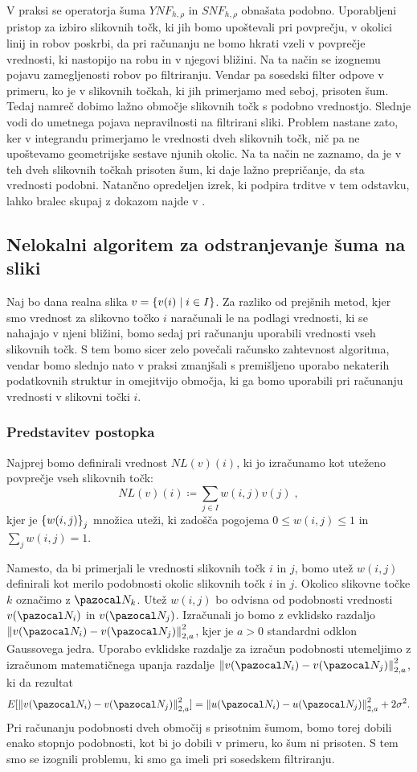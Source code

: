 V praksi se operatorja šuma $YNF_{h, \rho}$ in $SNF_{h, \rho}$ obnašata podobno. Uporabljeni pristop za izbiro slikovnih točk, ki jih bomo upoštevali pri povprečju, v okolici linij in robov poskrbi, da pri računanju ne bomo hkrati vzeli v povprečje vrednosti, ki nastopijo na robu in v njegovi bližini. Na ta način se izognemu pojavu zamegljenosti robov po filtriranju. Vendar pa sosedski filter odpove v primeru, ko je v slikovnih točkah, ki jih primerjamo med seboj, prisoten šum. Tedaj namreč dobimo lažno območje slikovnih točk s podobno vrednostjo. Slednje vodi do umetnega pojava nepravilnosti na filtrirani sliki. Problem nastane zato, ker v integrandu primerjamo le vrednosti dveh slikovnih točk, nič pa ne upoštevamo geometrijske sestave njunih okolic. Na ta način ne zaznamo, da je v teh dveh slikovnih točkah prisoten šum, ki daje lažno prepričanje, da sta vrednosti podobni. Natančno opredeljen izrek, ki podpira trditve v tem odstavku, lahko bralec skupaj z dokazom najde v \cite[strani 10--13]{Buades:PDE}.
\subsection{Nelokalni algoritem za odstranjevanje šuma na sliki}
Naj bo dana realna slika $v = \left\{v(i) \mid i\in I\right\}$. Za razliko od prejšnih metod, kjer smo vrednost za slikovno točko $i$ naračunali le na podlagi vrednosti, ki se nahajajo v njeni bližini, bomo sedaj pri računanju uporabili vrednosti vseh slikovnih točk. S tem bomo sicer zelo povečali računsko zahtevnost algoritma, vendar bomo slednjo nato v praksi zmanjšali s premišljeno uporabo nekaterih podatkovnih struktur in omejitvijo območja, ki ga bomo uporabili pri računanju vrednosti v slikovni točki $i$.
%
\subsubsection{Predstavitev postopka}
Najprej bomo definirali vrednost $NL(v)(i)$, ki jo izračunamo kot uteženo povprečje vseh slikovnih točk:
%
$$NL(v)(i) \coloneqq \sum_{j\in I} w(i, j) v(j)\;,$$
%
kjer je $\left\{w(i, j)\right\}_j$ množica uteži, ki zadošča pogojema $0 \leq w(i, j) \leq 1$ in $\sum_j w(i, j) = 1$.

Namesto, da bi primerjali le vrednosti slikovnih točk $i$ in $j$, bomo utež $w(i, j)$ definirali kot merilo podobnosti okolic slikovnih točk $i$ in $j$. Okolico slikovne točke $k$ označimo z $\NN_k$. Utež $w(i, j)$ bo odvisna od podobnosti vrednosti $v(\NN_i)$ in $v(\NN_j)$. Izračunali jo bomo z evklidsko razdaljo $\norm{v(\NN_i) - v(\NN_j)}_{2, a}^2$, kjer je $a > 0$ standardni odklon Gaussovega jedra. Uporabo evklidske razdalje za izračun podobnosti utemeljimo z izračunom matematičnega upanja razdalje $\norm{v(\NN_i) - v(\NN_j)}_{2, a}^2$, ki da rezultat
%
$$E[\norm{v(\NN_i) - v(\NN_j)}_{2, a}^2] = \norm{u(\NN_i) - u(\NN_j)}_{2, a}^2 + 2 \sigma^2.$$
%
Pri računanju podobnosti dveh območij s prisotnim šumom, bomo torej dobili enako stopnjo podobnosti, kot bi jo dobili v primeru, ko šum ni prisoten. S tem smo se izognili problemu, ki smo ga imeli pri sosedskem filtriranju.

